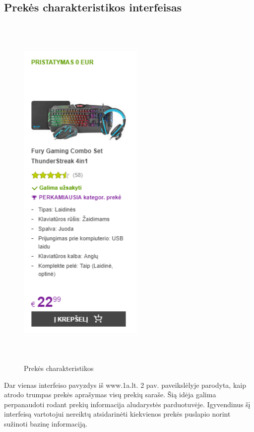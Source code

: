 \documentclass[oneside]{VUMIFPSkursinis}
\begin{document}
	\subsection{Prekės charakteristikos interfeisas}
		
	
		  \begin{figure}[h]
			\centering
			\includegraphics[width=6cm,height=18cm,keepaspectratio]{IkvepiantisInterfeisas2.png}
			\caption{ Prekės charakteristikos}
		\end{figure}

			Dar vienas interfeiso pavyzdys iš www.1a.lt. 2 pav.
			 paveikslėlyje parodyta, kaip atrodo trumpas prekės aprašymas visų prekių saraše.
			 Šią idėja galima perpanaudoti rodant prekių informacija aludarystės parduotuvėje.
			 Igyvendinus šį interfeisą vartotojui nereiktų atsidarinėti kiekvienos prekės puslapio norint sužinoti bazinę informaciją.

	\pagebreak
\end{document}
